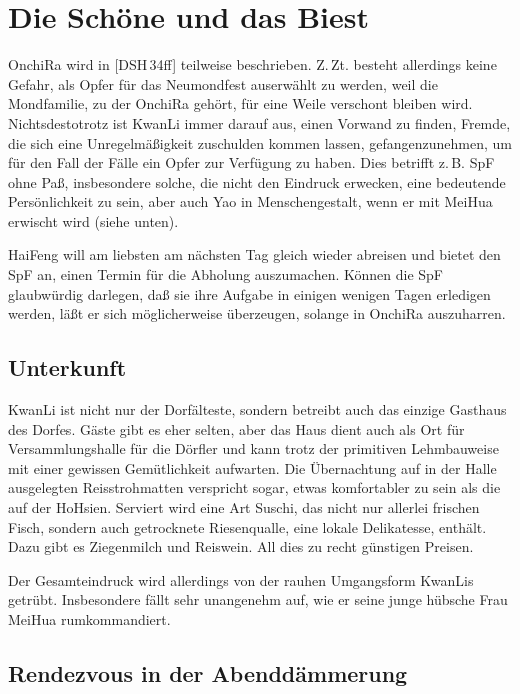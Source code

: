 \documentclass[
a4paper,
twoside,
DIV=calc,
BCOR=4mm,
fontsize=9pt,
twocolumn=on,
titlepage=on,
parskip=half
]{scrartcl}
\begin{document}
\section{Die Schöne und das Biest}
\label{biest}

OnchiRa wird in [DSH\,34ff] teilweise beschrieben. Z.\,Zt. besteht
allerdings keine Gefahr, als Opfer für das Neumondfest auserwählt zu
werden, weil die Mondfamilie, zu der OnchiRa gehört, für eine Weile
verschont bleiben wird. Nichtsdestotrotz ist KwanLi immer darauf aus,
einen Vorwand zu finden, Fremde, die sich eine Unregelmäßigkeit
zuschulden kommen lassen, gefangenzunehmen, um für den
Fall der Fälle ein Opfer zur Verfügung zu haben. Dies betrifft
z.\,B. SpF ohne Paß, insbesondere solche, die nicht den Eindruck
erwecken, eine bedeutende Persönlichkeit zu sein, aber auch Yao in
Menschengestalt, wenn er mit MeiHua erwischt wird (siehe unten).

HaiFeng will am liebsten am nächsten Tag gleich wieder abreisen und
bietet den SpF an, einen Termin für die Abholung auszumachen. Können
die SpF glaubwürdig darlegen, daß sie ihre Aufgabe in einigen wenigen
Tagen erledigen werden, läßt er sich möglicherweise überzeugen,
solange in OnchiRa auszuharren.

\subsection{Unterkunft}

KwanLi ist nicht nur der Dorfälteste, sondern betreibt auch das
einzige Gasthaus des Dorfes. Gäste gibt es eher selten, aber das Haus
dient auch als Ort für Versammlungshalle für die Dörfler und kann
trotz der primitiven Lehmbauweise mit einer gewissen Gemütlichkeit
aufwarten. Die Übernachtung auf in der Halle ausgelegten
Reisstrohmatten verspricht sogar, etwas komfortabler zu sein als die
auf der HoHsien. Serviert wird eine Art Suschi, das nicht nur allerlei
frischen Fisch, sondern auch getrocknete Riesenqualle, eine lokale
Delikatesse, enthält. Dazu gibt es Ziegenmilch und Reiswein. All dies
zu recht günstigen Preisen.

Der Gesamteindruck wird allerdings von der rauhen Umgangsform
KwanLis getrübt. Insbesondere fällt sehr unangenehm auf, wie er seine
junge hübsche Frau MeiHua rumkommandiert.

\subsection{Rendezvous in der Abenddämmerung}
\end{document}
